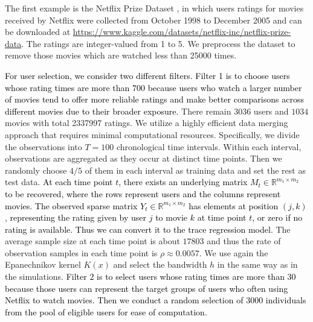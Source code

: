 \documentclass[12pt]{article}
\newcommand{\oldchange}[1]{\textcolor{black}{#1}}
\begin{document}
  The first example is the Netflix Prize Dataset \citep{netflix_dataset}, in which users ratings for movies received by Netflix were collected from
  October 1998 to December 2005 and can be downloaded at \href{https://www.kaggle.com/datasets/netflix-inc/netflix-prize-data}{https://www.kaggle.com/datasets/netflix-inc/netflix-prize-data}. The ratings are integer-valued from 1 to 5. We preprocess the dataset to remove those movies which are watched less than 25000 times. 
  
  \oldchange{For user selection, we consider two different filters. Filter 1 is to choose users whose rating times are more than 700 because users who watch a larger number of movies tend to offer more reliable ratings  and make better comparisons across different movies due to their broader exposure.} There remain $3036$ users and $1034$ movies with total 2337997 ratings. We utilize a highly efficient data merging approach that requires minimal computational resources. Specifically, we divide the observations into $T=100$ chronological time intervals. Within each interval, observations are aggregated as they occur at distinct time points. Then we randomly choose $4/5$ of them in each interval as training data and set the rest as test data. 
  \oldchange{At each time point $t$, there exists an underlying matrix $M_t\in \mathbb{R}^{m_1\times m_2}$ to be recovered, where the rows represent users and the columns represent movies. The observed  sparse matrix $Y_t\in \mathbb{R}^{m_1\times m_2}$ has elements at position $(j,k)$, representing the rating given by user $j$ to movie $k$ at time point $t$, or zero if no rating is available. Thus we can convert it to the trace regression model.}
  The average sample size at each time point is about $17803$ and thus the rate of observation samples in each time point is $\rho \approx 0.0057$. We use again the Epanechnikov kernel $K(x)$ and select the bandwidth $h$ in the same way as in the simulations. \oldchange{Filter 2 is to select users whose rating times are more than 30 because those users can represent the target groups of users who often using Netflix to watch movies. Then we conduct a random selection of 3000 individuals from the pool of eligible users for ease of computation.}
  
\end{document}
